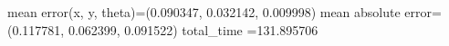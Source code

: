 mean error(x, y, theta)=(0.090347, 0.032142, 0.009998)
mean absolute error=(0.117781, 0.062399, 0.091522)
total_time =131.895706